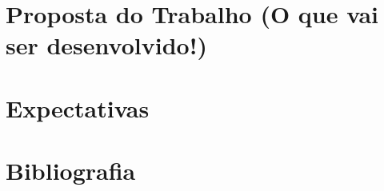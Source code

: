 \documentclass[
	12pt,				%
	openright,			%
	oneside,
	a4paper,			%
	english,			%
	french,				%
	spanish,			%
	brazil				%
	]{abntex2}
\begin{document}
\chapter[Proposta do Trabalho]{Proposta do Trabalho (O que vai ser desenvolvido!)}


\chapter[Expectativas]{Expectativas}



\postextual

\chapter[Bibliografia]{Bibliografia}




\end{document}
